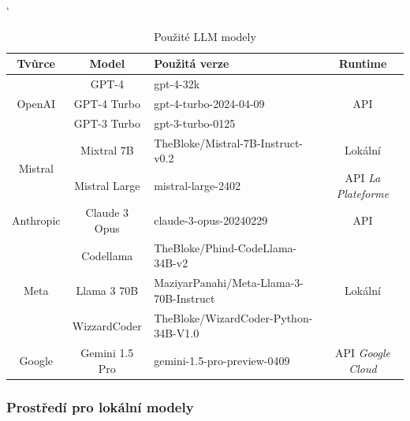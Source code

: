 \documentclass[czech, ma, kiv, he, iso690alph, pdf, viewonly]{fasthesis}
\begin{document}
            \begin{table}
                \catcode`
                \begin{tabular}{|c|c|p{5cm}|c|}
                    \hline
                    \textbf{Tvůrce} & \textbf{Model} & \textbf{Použitá verze} & \textbf{Runtime} \\
                    \hline
                    \multirow{3}{*}{OpenAI} & GPT-4 & gpt-4-32k & \multirow{3}{*}{API} \\
                    \cline{2-3} 
                    & GPT-4 Turbo & gpt-4-turbo-2024-04-09 &  \\
                    \cline{2-3} 
                    & GPT-3 Turbo & gpt-3-turbo-0125 &  \\
                    \hline
                    \multirow{2}{*}{Mistral} & Mixtral 7B & TheBloke/Mistral-7B-Instruct-v0.2 & Lokální \\
                    \cline{2-4} 
                     & Mistral Large & mistral-large-2402 & API \textit{La Plateforme} \\
                    \hline
                    Anthropic & Claude 3 Opus & claude-3-opus-20240229 & API \\
                    \hline
                    \multirow{3}{*}{Meta} & Codellama & TheBloke/Phind-CodeLlama-34B-v2 & \multirow{3}{*}{Lokální} \\
                    \cline{2-3}
                     & Llama 3 70B & MaziyarPanahi/Meta-Llama-3-70B-Instruct & \\
                    \cline{2-3}
                     & WizzardCoder & TheBloke/WizardCoder-Python-34B-V1.0 & \\
                    \hline
                    Google & Gemini 1.5 Pro & gemini-1.5-pro-preview-0409 & API \textit{Google Cloud} \\
                    \hline
                \end{tabular}
                \centering
                \caption{Použité LLM modely}
                \label{tab:used_models}
            \end{table}

            \subsubsection{Prostředí pro lokální modely} \label{sec:local_env}
\end{document}
